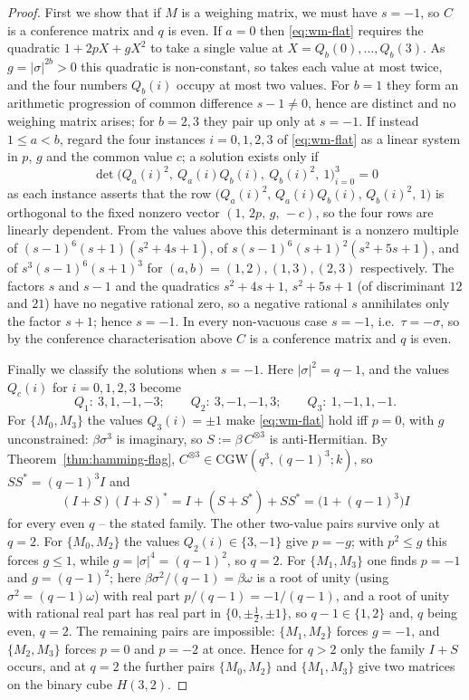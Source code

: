 \documentclass{article}
\theoremstyle{definition}
\theoremstyle{remark}
\newcommand{\CGW}{\mathrm{CGW}}
\begin{document}
\begin{proof}
First we show that if $M$ is a weighing matrix, we must have $s=-1$, so $C$ is a conference matrix and
$q$ is even.  If $a=0$ then 
\eqref{eq:wm-flat} requires the
quadratic $1+2pX+gX^2$ to take a single value at $X=Q_b(0),\dots,Q_b(3)$.  As
$g=|\sigma|^{2b}>0$ this quadratic is non-constant, so takes each value at most
twice, and the four numbers $Q_b(i)$ occupy at most two values.  For
$b=1$ they form an arithmetic progression of common difference $s-1\neq0$, hence
are distinct and no weighing matrix arises; for $b=2,3$ they pair up only at
$s=-1$.  If instead $1\le a<b$, regard the four instances $i=0,1,2,3$ of
\eqref{eq:wm-flat} as a linear system in $p$, $g$ and the common value $c$; a
solution exists only if
\[
  \det\bigl(Q_a(i)^2,\ Q_a(i)Q_b(i),\ Q_b(i)^2,\ 1\bigr)_{i=0}^{3}=0
\]
as each instance asserts that the row $\bigl(Q_a(i)^2,\,Q_a(i)Q_b(i),\,Q_b(i)^2,\,1\bigr)$
is orthogonal to the fixed nonzero vector $(1,\,2p,\,g,\,-c)$, so the four rows are
linearly dependent.  From the values above this determinant is a nonzero multiple of
$(s{-}1)^6(s{+}1)(s^2{+}4s{+}1)$, of $s(s{-}1)^6(s{+}1)^2(s^2{+}5s{+}1)$, and of
$s^3(s{-}1)^6(s{+}1)^3$ for $(a,b)=(1,2),(1,3),(2,3)$ respectively.  The factors
$s$ and $s-1$ and the quadratics $s^2+4s+1$, $s^2+5s+1$ (of discriminant $12$
and $21$) have no negative rational zero, so a negative rational $s$ annihilates
only the factor $s+1$; hence $s=-1$.  In every
non-vacuous case $s=-1$, i.e.\ $\tau=-\sigma$, so by the conference
characterisation above $C$ is a conference matrix and $q$ is even.

Finally we classify the solutions when $s=-1$.  Here $|\sigma|^2=q-1$, and the values
$Q_c(i)$ for $i=0,1,2,3$ become
\[
  Q_1:\ 3,1,-1,-3; \qquad Q_2:\ 3,-1,-1,3; \qquad Q_3:\ 1,-1,1,-1.
\]
For $\{M_0,M_3\}$ the values $Q_3(i)=\pm1$ make \eqref{eq:wm-flat} hold iff $p=0$,
with $g$ unconstrained: $\beta\sigma^3$ is imaginary, so $S:=\beta\,C^{\otimes3}$
is anti-Hermitian.  By Theorem~\ref{thm:hamming-flag},
$C^{\otimes3}\in\CGW(q^3,(q-1)^3;k)$, so $SS^*=(q-1)^3I$ and
\[
  (I+S)(I+S)^*=I+(S+S^*)+SS^*=\bigl(1+(q-1)^3\bigr)I
\]
for every even $q$ -- the stated family.  The other two-value pairs survive only
at $q=2$.  For $\{M_0,M_2\}$ the values $Q_2(i)\in\{3,-1\}$ give $p=-g$; with
$p^2\le g$ this forces $g\le1$, while $g=|\sigma|^4=(q-1)^2$, so $q=2$.  For
$\{M_1,M_3\}$ one finds $p=-1$ and $g=(q-1)^2$; here
$\beta\sigma^2/(q-1)=\beta\omega$ is a root of unity (using $\sigma^2=(q-1)\omega$)
with real part $p/(q-1)=-1/(q-1)$, and a root of unity with rational real part has
real part in $\{0,\pm\tfrac12,\pm1\}$, so $q-1\in\{1,2\}$ and, $q$ being even,
$q=2$.  The
remaining pairs are impossible: $\{M_1,M_2\}$ forces $g=-1$, and $\{M_2,M_3\}$
forces $p=0$ and $p=-2$ at once.  Hence for $q>2$ only the family $I+S$ occurs,
and at $q=2$ the further pairs $\{M_0,M_2\}$ and $\{M_1,M_3\}$ give two matrices
on the binary cube $H(3,2)$.
\end{proof}
\end{document}
